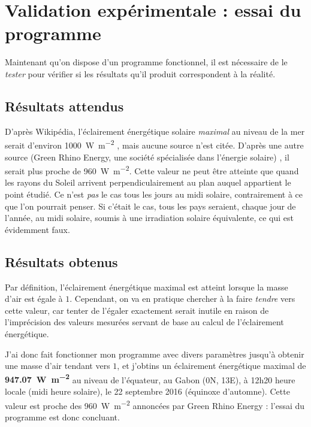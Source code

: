 \documentclass[12pt]{article}
\begin{document}
\section{Validation expérimentale : essai du programme}

Maintenant qu'on dispose d'un programme fonctionnel, il est nécessaire de le \emph{tester} pour vérifier si les résultats qu'il produit correspondent à la réalité.

\subsection{Résultats attendus}

D'après Wikipédia, l'éclairement énergétique solaire \emph{maximal} au niveau de la mer serait d'environ \SI{1000}{\watt\per\square\meter} \cite{earth_irradiance_wiki}, mais aucune source n'est citée.
D'après une autre source (Green Rhino Energy, une société spécialisée dans l'énergie solaire) \cite{green_rhino_irradiance}, il serait plus proche de \SI{960}{\watt\per\square\meter}.
Cette valeur ne peut être atteinte que quand les rayons du Soleil arrivent perpendiculairement au plan auquel appartient le point étudié.
Ce n'est \emph{pas} le cas tous les jours au midi solaire, contrairement à ce que l'on pourrait penser.
Si c'était le cas, tous les pays seraient, chaque jour de l'année, au midi solaire, soumis à une irradiation solaire équivalente, ce qui est évidemment faux.


\subsection{Résultats obtenus}

Par définition, l'éclairement énergétique maximal est atteint lorsque la masse d'air est égale à $1$.
Cependant, on va en pratique chercher à la faire \emph{tendre} vers cette valeur, car tenter de l'égaler exactement serait inutile en raison de l'imprécision des valeurs mesurées servant de base au calcul de l'éclairement énergétique.

J'ai donc fait fonctionner mon programme avec divers paramètres jusqu'à obtenir une masse d'air tendant vers $1$, et j'obtins un éclairement énergétique maximal de \textbf{\SI{947.07}{\watt\per\square\meter}} au niveau de l'équateur, au Gabon (0\degree N, 13\degree E), à 12h20 heure locale (midi heure solaire), le 22 septembre 2016 (équinoxe d'automne).
Cette valeur est proche des \SI{960}{\watt\per\square\meter} annoncées par Green Rhino Energy : l'essai du programme est donc concluant.
\end{document}
